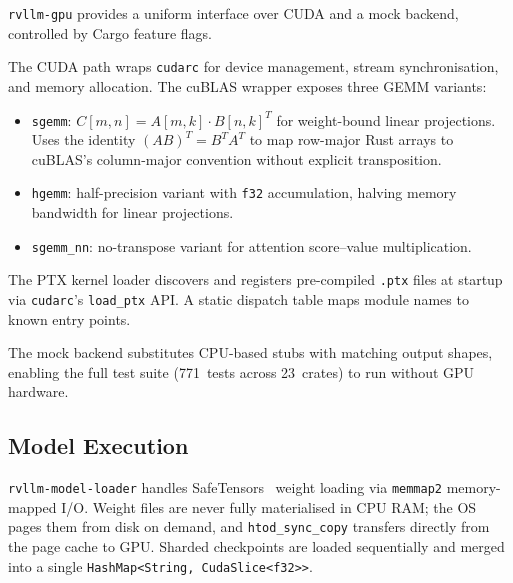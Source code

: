 \texttt{rvllm-gpu} provides a uniform interface over CUDA and a mock backend,
controlled by Cargo feature flags.

The CUDA path wraps \texttt{cudarc} for device management, stream synchronisation,
and memory allocation. The cuBLAS wrapper exposes three GEMM variants:

\begin{itemize}
  \item \texttt{sgemm}: $C[m,n] = A[m,k] \cdot B[n,k]^T$ for weight-bound linear
        projections. Uses the identity $(AB)^T = B^T A^T$ to map row-major Rust arrays
        to cuBLAS's column-major convention without explicit transposition.
  \item \texttt{hgemm}: half-precision variant with \texttt{f32} accumulation, halving
        memory bandwidth for linear projections.
  \item \texttt{sgemm\_nn}: no-transpose variant for attention score--value
        multiplication.
\end{itemize}

The PTX kernel loader discovers and registers pre-compiled \texttt{.ptx} files at
startup via \texttt{cudarc}'s \texttt{load\_ptx} API. A static dispatch table maps
module names to known entry points.

The mock backend substitutes CPU-based stubs with matching output shapes, enabling
the full test suite (771~tests across 23~crates) to run without GPU hardware.

\subsection{Model Execution}

\texttt{rvllm-model-loader} handles SafeTensors~\cite{safetensors2023} weight loading
via \texttt{memmap2} memory-mapped I/O. Weight files are never fully materialised in
CPU RAM; the OS pages them from disk on demand, and \texttt{htod\_sync\_copy}
transfers directly from the page cache to GPU. Sharded checkpoints are loaded
sequentially and merged into a single \texttt{HashMap<String, CudaSlice<f32>{}>}.

